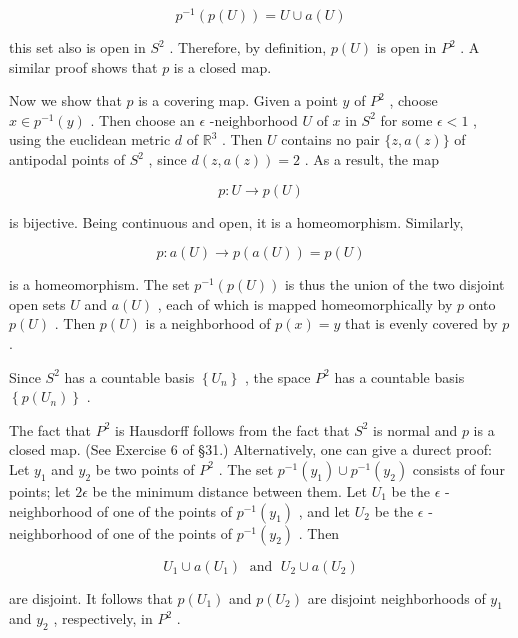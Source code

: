 \documentclass[10pt]{article}
\begin{document}
\[
{p}^{-1}\left( {p\left( U\right) }\right)  = U \cup  a\left( U\right)
\]

this set also is open in \({S}^{2}\) . Therefore, by definition, \(p\left( U\right)\) is open in \({P}^{2}\) . A similar proof shows that \(p\) is a closed map.

Now we show that \(p\) is a covering map. Given a point \(y\) of \({P}^{2}\) , choose \(x \in  {p}^{-1}\left( y\right)\) . Then choose an \(\epsilon\) -neighborhood \(U\) of \(x\) in \({S}^{2}\) for some \(\epsilon  < 1\) , using the euclidean metric \(d\) of \({\mathbb{R}}^{3}\) . Then \(U\) contains no pair \(\{ z,a\left( z\right) \}\) of antipodal points of \({S}^{2}\) , since \(d\left( {z,a\left( z\right) }\right)  = 2\) . As a result, the map

\[
p : U \rightarrow  p\left( U\right)
\]

is bijective. Being continuous and open, it is a homeomorphism. Similarly,

\[
p : a\left( U\right)  \rightarrow  p\left( {a\left( U\right) }\right)  = p\left( U\right)
\]

is a homeomorphism. The set \({p}^{-1}\left( {p\left( U\right) }\right)\) is thus the union of the two disjoint open sets \(U\) and \(a\left( U\right)\) , each of which is mapped homeomorphically by \(p\) onto \(p\left( U\right)\) . Then \(p\left( U\right)\) is a neighborhood of \(p\left( x\right)  = y\) that is evenly covered by \(p\) .

Since \({S}^{2}\) has a countable basis \(\left\{  {U}_{n}\right\}\) , the space \({P}^{2}\) has a countable basis \(\left\{  {p\left( {U}_{n}\right) }\right\}\) .

The fact that \({P}^{2}\) is Hausdorff follows from the fact that \({S}^{2}\) is normal and \(p\) is a closed map. (See Exercise 6 of §31.) Alternatively, one can give a durect proof: Let \({y}_{1}\) and \({y}_{2}\) be two points of \({P}^{2}\) . The set \({p}^{-1}\left( {y}_{1}\right)  \cup  {p}^{-1}\left( {y}_{2}\right)\) consists of four points; let \({2\epsilon }\) be the minimum distance between them. Let \({U}_{1}\) be the \(\epsilon\) -neighborhood of one of the points of \({p}^{-1}\left( {y}_{1}\right)\) , and let \({U}_{2}\) be the \(\epsilon\) -neighborhood of one of the points of \({p}^{-1}\left( {y}_{2}\right)\) . Then

\[
{U}_{1} \cup  a\left( {U}_{1}\right) \;\text{ and }\;{U}_{2} \cup  a\left( {U}_{2}\right)
\]

are disjoint. It follows that \(p\left( {U}_{1}\right)\) and \(p\left( {U}_{2}\right)\) are disjoint neighborhoods of \({y}_{1}\) and \({y}_{2}\) , respectively, in \({P}^{2}\) .
\end{document}
